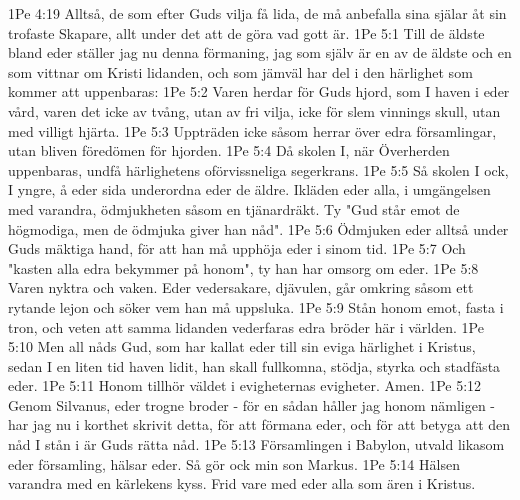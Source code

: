 1Pe 4:19  Alltså, de som efter Guds vilja få lida, de må anbefalla sina själar åt sin trofaste Skapare, allt under det att de göra vad gott är.
1Pe 5:1  Till de äldste bland eder ställer jag nu denna förmaning, jag som själv är en av de äldste och en som vittnar om Kristi lidanden, och som jämväl har del i den härlighet som kommer att uppenbaras:
1Pe 5:2  Varen herdar för Guds hjord, som I haven i eder vård, varen det icke av tvång, utan av fri vilja, icke för slem vinnings skull, utan med villigt hjärta.
1Pe 5:3  Uppträden icke såsom herrar över edra församlingar, utan bliven föredömen för hjorden.
1Pe 5:4  Då skolen I, när Överherden uppenbaras, undfå härlighetens oförvissneliga segerkrans.
1Pe 5:5  Så skolen I ock, I yngre, å eder sida underordna eder de äldre. Ikläden eder alla, i umgängelsen med varandra, ödmjukheten såsom en tjänardräkt. Ty "Gud står emot de högmodiga, men de ödmjuka giver han nåd".
1Pe 5:6  Ödmjuken eder alltså under Guds mäktiga hand, för att han må upphöja eder i sinom tid.
1Pe 5:7  Och "kasten alla edra bekymmer på honom", ty han har omsorg om eder.
1Pe 5:8  Varen nyktra och vaken. Eder vedersakare, djävulen, går omkring såsom ett rytande lejon och söker vem han må uppsluka.
1Pe 5:9  Stån honom emot, fasta i tron, och veten att samma lidanden vederfaras edra bröder här i världen.
1Pe 5:10  Men all nåds Gud, som har kallat eder till sin eviga härlighet i Kristus, sedan I en liten tid haven lidit, han skall fullkomna, stödja, styrka och stadfästa eder.
1Pe 5:11  Honom tillhör väldet i evigheternas evigheter. Amen.
1Pe 5:12  Genom Silvanus, eder trogne broder - för en sådan håller jag honom nämligen - har jag nu i korthet skrivit detta, för att förmana eder, och för att betyga att den nåd I stån i är Guds rätta nåd.
1Pe 5:13  Församlingen i Babylon, utvald likasom eder församling, hälsar eder. Så gör ock min son Markus.
1Pe 5:14  Hälsen varandra med en kärlekens kyss. Frid vare med eder alla som ären i Kristus.


